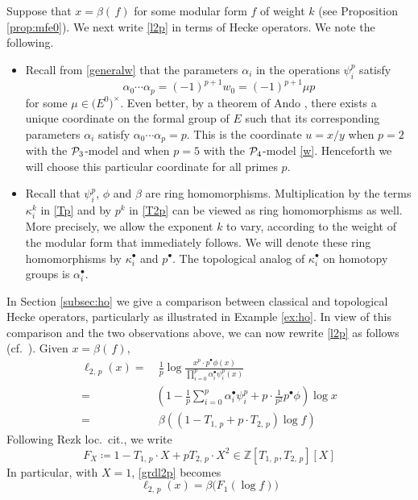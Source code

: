 \documentclass{gtpart}
\theoremstyle{definition}
\theoremstyle{remark}
\newcommand{\mb}[1]{\mathbb{#1}}
\newcommand{\CP}{{\cal P}}
\newcommand{\BZ}{{\mb Z}}
\newcommand{\A}{\alpha}
\newcommand{\B}{\beta}
\newcommand{\K}{\kappa}
\newcommand{\ce}{\coloneqq}
\renewcommand{\=}{\approx}
\renewcommand{\-}{\sim}
\numberwithin{equation}{section}
\numberwithin{thm}{section}
\begin{document}
Suppose that $x = \B(\,f)$ for some modular form $f$ of weight $k$ (see Proposition \ref{prop:mfe0}).  
We next write \eqref{l2p} in terms of Hecke operators.  
We note the following.  
\begin{itemize}
 \item Recall from \eqref{generalw} that the parameters $\A_i$ in the operations $\psi^p_i$ satisfy 
 \[
  \A_0 \cdots \A_p = (-1)^{p+1} w_0 = (-1)^{p+1} \mu p 
 \]
 for some $\mu \in \big( E^0 \big)^{\!\times}$.  
 Even better, by a theorem of Ando \cite[Theorem 4]{Ando95}, there exists a unique coordinate on the formal group of $E$ such that 
 its corresponding parameters $\A_i$ satisfy $\A_0 \cdots \A_p = p$.  
 This is the coordinate $u = x/y$ when $p = 2$ with the $\CP_3$-model \cite[Section 3]{h2p2} 
 and when $p = 5$ with the $\CP_4$-model \eqref{w}.  
 Henceforth we will choose this particular coordinate for all primes $p$.  

 \item Recall that $\psi^p_i$, $\phi$ and $\B$ are ring homomorphisms.  
 Multiplication by the terms $\K_i^k$ in \eqref{Tp} and by $p^k$ in \eqref{T2p} can be viewed as ring homomorphisms as well.  
 More precisely, we allow the exponent $k$ to vary, 
 according to the weight of the modular form that immediately follows.  
 We will denote these ring homomorphisms by $\K_i^\bullet$ and $p^\bullet$.  
 The topological analog of $\K_i^\bullet$ on homotopy groups is $\A_i^\bullet$.  
\end{itemize}
In Section \ref{subsec:ho} we give a comparison between classical and topological Hecke operators, particularly as illustrated in Example \ref{ex:ho}.  
In view of this comparison and the two observations above, we can now rewrite \eqref{l2p} as follows (cf.~\cite[1.12]{log}).  
Given $x = \B(\,f)$, 
\begin{equation}
 \label{grdl2p}
 \begin{split}
  \ell_{2,\,p}(x) = & ~ \frac{1}{p} \log \frac{x^p \cdot p^\bullet \phi(x)}{\prod_{i=0}^p \A_i^\bullet \psi^p_i(x)} \\
                 = & \left( 1 - \frac{1}{p} \sum_{i=0}^p \A_i^\bullet \psi^p_i + p \cdot \frac{1}{p^2} p^\bullet \phi \right) \log x \\
                 = & ~ \B \left( (1 - T_{1,\,p} + p \cdot T_{2,\,p}) \log f \right) 
 \end{split}
\end{equation}
Following Rezk loc.~cit., we write 
\begin{equation}
 \label{FX}
 F_X \ce 1 - T_{1,\,p} \cdot X + p T_{2,\,p} \cdot X^2 \in \BZ[T_{1,\,p},T_{2,\,p}][X] 
\end{equation}
In particular, with $X = 1$, \eqref{grdl2p} becomes 
\begin{equation}
 \label{F1}
 \ell_{2,\,p}(x) = \B \big( F_1 (\log f) \big) 
\end{equation}
\end{document}
